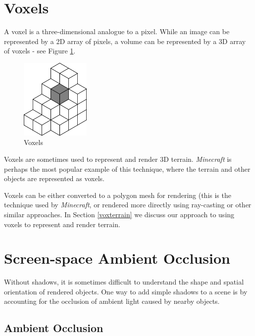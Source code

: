 \section{Voxels} \label{voxels}

A voxel is a three-dimensional analogue to a pixel.
While an image can be represented by a 2D array of pixels, a volume can be represented by a 3D array of voxels - see Figure \ref{fig:voxels}.

\begin{figure}
	\centering
		\includegraphics[width=0.3\textwidth]{figures/voxels}
	\caption{Voxels \cite{voxels_fig}}
	\label{fig:voxels}
\end{figure}

Voxels are sometimes used to represent and render 3D terrain.
{\em Minecraft} is perhaps the most popular example of this technique, where the terrain and other objects are represented as voxels.

Voxels can be either converted to a polygon mesh for rendering (this is the technique used by {\em Minecraft}, or rendered more directly using ray-casting or other similar approaches.
In Section \ref{voxterrain} we discuss our approach to using voxels to represent and render terrain.


\section{Screen-space Ambient Occlusion} \label{ssao}

Without shadows, it is sometimes difficult to understand the shape and spatial orientation of rendered objects.
One way to add simple shadows to a scene is by accounting for the occlusion of ambient light caused by nearby objects.


\subsection{Ambient Occlusion}

